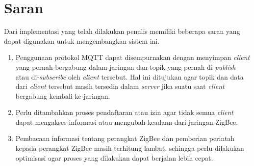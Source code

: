 \section{Saran}

Dari implementasi yang telah dilakukan penulis memiliki beberapa saran yang dapat digunakan untuk mengembangkan sistem ini.

\begin{enumerate}

\item Penggunaan protokol MQTT dapat disempurnakan dengan menyimpan \textit{client} yang pernah bergabung dalam jaringan dan topik yang pernah di-\textit{publish} atau di-\textit{subscribe} oleh \textit{client} tersebut. Hal ini ditujukan agar topik dan data dari \textit{client} tersebut masih tersedia dalam \textit{server} jika suatu saat \textit{client} bergabung kembali ke jaringan.

\item Perlu ditambahkan proses pendaftaran atau izin agar tidak semua \textit{client} dapat mengakses informasi atau mengubah keadaan dari jaringan ZigBee.

\item Pembacaan informasi tentang perangkat ZigBee dan pemberian perintah kepada perangkat ZigBee masih terhitung lambat, sehingga perlu dilakukan optimisasi agar proses yang dilakukan dapat berjalan lebih cepat.

\end{enumerate}
